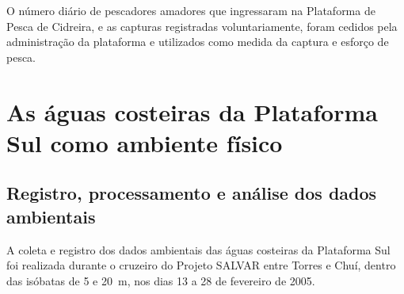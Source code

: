 \documentclass[a4paper,11pt,twoside,showtrims,onecolumn,openright,final]{memoir}
\begin{document}
O número diário de pescadores amadores que ingressaram na Plataforma de Pesca de Cidreira, 
e as capturas registradas voluntariamente, foram cedidos pela administração da plataforma 
e utilizados como medida da captura e esforço de pesca.



\chapter[As águas costeiras da Plataforma Sul como ambiente físico]
        {As águas costeiras da Plataforma Sul como ambiente físico}\label{chap:ambiente-fisico}




\newpage

\section*{Registro, processamento e análise dos dados ambientais}

A coleta e registro dos dados ambientais das águas costeiras da Plataforma Sul foi realizada 
durante o cruzeiro do Projeto SALVAR entre Torres e Chuí, dentro das isóbatas de 5 e 20~m,
nos dias 13 a 28 de fevereiro de 2005.

\end{document}
